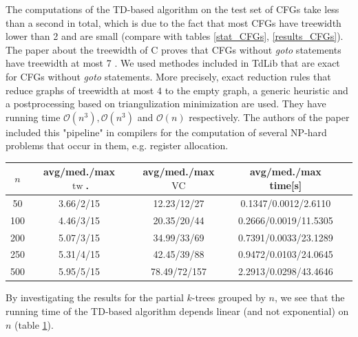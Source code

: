 \documentclass[11pt,a4paper]{article}
\DeclareMathOperator{\tw}{tw}
\DeclareMathOperator{\VC}{VC}
\begin{document}
The computations of the TD-based algorithm on the test set of CFGs take less than a second in total, which is due to the fact that most CFGs have treewidth lower than 2 and are small (compare with tables \ref{stat_CFGs}, \ref{results_CFGs}). The paper about the treewidth of C proves that CFGs without \emph{goto} statements have treewidth at most 7 \cite{Ctree}. We used methodes included in TdLib that are exact for CFGs without \emph{goto} statements. More precisely, exact reduction rules that reduce graphs of treewidth at most $4$ to the empty graph, a generic heuristic and a postprocessing based on triangulization minimization are used. They have running time $\mathcal{O}(n^{3}), \mathcal{O}(n^{3})$ and $\mathcal{O}(n)$ respectively. The authors of the paper included this "pipeline" in compilers for the computation of several NP-hard problems that occur in them, e.g. register allocation.  

\begin{center}
\begin{table}[h!]
\centering
\begin{tabular}{|c|c|c|c|c|}
\hline
$n$ & avg/med./max $\tw$. & avg/med./max $\VC$ & avg/med./max time[s] \\
\hline \hline
50 & 3.66/2/15 & 12.23/12/27 & 0.1347/0.0012/2.6110 \\
\hline
100 & 4.46/3/15 & 20.35/20/44 & 0.2666/0.0019/11.5305 \\
\hline
200 & 5.07/3/15 & 34.99/33/69 & 0.7391/0.0033/23.1289 \\
\hline
250 & 5.31/4/15 & 42.45/39/88 & 0.9472/0.0103/24.0645 \\
\hline
500 & 5.95/5/15 & 78.49/72/157 & 2.2913/0.0298/43.4646 \\
\hline
\end{tabular}
\label{results_ktrees_n}
\end{table}
\end{center}

By investigating the results for the partial $k$-trees grouped by $n$, we see that the running time of the TD-based algorithm depends linear (and not exponential) on $n$ (table \ref{results_ktrees_n}).
\end{document}
